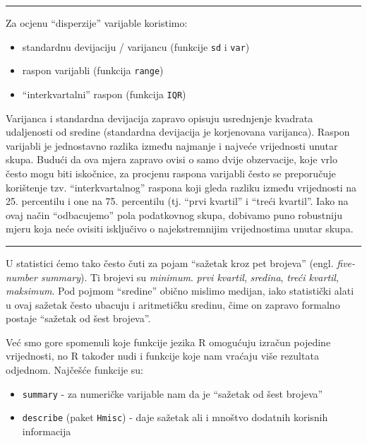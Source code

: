 \documentclass[]{book}
\providecommand{\tightlist}{%
  \setlength{\itemsep}{0pt}\setlength{\parskip}{0pt}}
\theoremstyle{definition}
\theoremstyle{definition}
\theoremstyle{definition}
\theoremstyle{remark}
\begin{document}
\begin{center}\rule{0.5\linewidth}{\linethickness}\end{center}

Za ocjenu ``disperzije'' varijable koristimo:

\begin{itemize}
\tightlist
\item
  standardnu devijaciju / varijancu (funkcije \texttt{sd} i
  \texttt{var})
\item
  raspon varijabli (funkcija \texttt{range})
\item
  ``interkvartalni'' raspon (funkcija \texttt{IQR})
\end{itemize}

Varijanca i standardna devijacija zapravo opisuju usrednjenje kvadrata
udaljenosti od sredine (standardna devijacija je korjenovana varijanca).
Raspon varijabli je jednostavno razlika između najmanje i najveće
vrijednosti unutar skupa. Budući da ova mjera zapravo ovisi o samo dvije
obzervacije, koje vrlo često mogu biti iskočnice, za procjenu raspona
varijabli često se preporučuje korištenje tzv. ``interkvartalnog''
raspona koji gleda razliku između vrijednosti na 25. percentilu i one na
75. percentilu (tj. ``prvi kvartil'' i ``treći kvartil''. Iako na ovaj
način ``odbacujemo'' pola podatkovnog skupa, dobivamo puno robustniju
mjeru koja neće ovisiti isključivo o najekstremnijim vrijednostima
unutar skupa.

\begin{center}\rule{0.5\linewidth}{\linethickness}\end{center}

U statistici ćemo tako često čuti za pojam ``sažetak kroz pet brojeva''
(engl. \emph{five-number summary}). Ti brojevi su \emph{minimum}.
\emph{prvi kvartil}, \emph{sredina}, \emph{treći kvartil},
\emph{maksimum}. Pod pojmom ``sredine'' obično mislimo medijan, iako
statistički alati u ovaj sažetak često ubacuju i aritmetičku sredinu,
čime on zapravo formalno postaje ``sažetak od šest brojeva''.

Već smo gore spomenuli koje funkcije jezika R omogućuju izračun pojedine
vrijednosti, no R također nudi i funkcije koje nam vraćaju više
rezultata odjednom. Najčešće funkcije su:

\begin{itemize}
\tightlist
\item
  \texttt{summary} - za numeričke varijable nam da je ``sažetak od šest
  brojeva''
\item
  \texttt{describe} (paket \texttt{Hmisc}) - daje sažetak ali i mnoštvo
  dodatnih korisnih informacija
\end{itemize}
\end{document}
